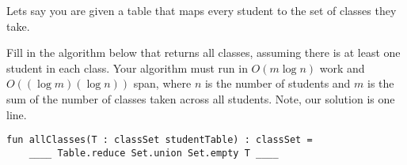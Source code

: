 \begin{problem}[4.][Classes]

Lets say you are given a table that maps every student to the set of
classes they take.  

\ask

Fill in the algorithm below that returns all classes,
assuming there is at least one student in each class.  Your algorithm
must run in $O(m \log n)$ work and $O((\log m)(\log n))$ span, where
$n$ is the number of students and $m$ is the sum of the number of
classes taken across all students.    Note, our solution is one line.

\solfin

\begin{lstlisting}[numbers=none]
fun allClasses(T : classSet studentTable) : classSet = 
    ____ Table.reduce Set.union Set.empty T ____

\end{lstlisting}

\end{problem}
